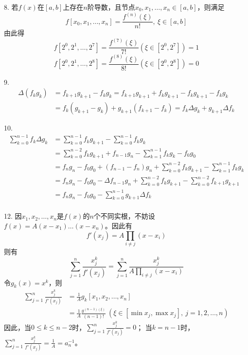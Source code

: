 \documentclass[12pt, a4paper]{article}
\theoremstyle{margin}
\begin{document}
8. 若$f\left(x\right)$在$\left[a,b\right]$上存在$n$阶导数，且节点$x_0,x_1,\dots,x_n\in \left[a,b\right]$，则满足
$$f\left[x_0,x_1,\dots,x_n\right]=\frac{f^{\left(n\right)}\left(\xi\right)}{n!},\ \xi\in \left[a,b\right]$$
由此得
$$f\left[2^0,2^1,\dots,2^7\right]=\frac{f^{\left(7\right)}\left(\xi\right)}{7!}\left(\xi \in \left[2^0,2^7\right]\right) = 1$$
$$f\left[2^0,2^1,\dots,2^8\right]=\frac{f^{\left(8\right)}\left(\xi\right)}{8!}\left(\xi \in \left[2^0,2^8\right]\right) = 0$$
\newline

9. 
\[\begin{split}
	\Delta\left(f_k g_k\right)&=f_{k+1} g_{k+1} - f_k g_k = f_{k+1} g_{k+1} + f_{k} g_{k+1} - f_{k} g_{k+1} - f_k g_k \\
	&= f_k\left(g_{k+1}-g_k\right) + g_{k+1} \left(f_{k+1}-f_{k}\right)=f_k \Delta g_k+g_{k+1}\Delta f_k
\end{split}\]
\newline 

10. 
\[\begin{split}
	\sum_{k=0}^{n-1}f_k\Delta g_k &= \sum_{k=0}^{n-1}f_k g_{k+1} - \sum_{k=0}^{n-1}f_k g_{k} \\
	&=\sum_{k=0}^{n-2}f_k g_{k+1} + f_{n-1} g_n - \sum_{k=1}^{n-1}f_k g_{k} - f_0 g_0 \\
	&=f_n g_n - f_0 g_0 + \left(f_{n-1} - f_n\right) g_n + \sum_{k=0}^{n-2}f_k g_{k+1} - \sum_{k=1}^{n-1}f_k g_{k} \\
	&= f_n g_n - f_0 g_0 - \Delta f_{n-1} g_n + \sum_{k=0}^{n-2}f_k g_{k+1} - \sum_{k=0}^{n-2}f_{k+1} g_{k+1} \\
  &= f_n g_n - f_0 g_0 - \sum_{k=0}^{n-1} g_{k+1} \Delta f_k \\
\end{split}\]
\newline 

12. 因$x_1,x_2,\dots,x_n$是$f\left(x\right)$的$n$个不同实根，不妨设$f\left(x\right)=A\left(x-x_1\right)\dots\left(x-x_n\right)$。因此有
\[f'\left(x_j\right)=A\prod_{i\ne j}\left(x-x_i\right)\]
则有
\[\sum_{j=1}^{n}\frac{x_j^k}{f'\left(x_j\right)}=\sum_{j=1}^{n}\frac{x_j^k}{A\prod_{i\ne j}\left(x-x_i\right)}\]
令$g_k\left(x\right)=x^k$，则
\[\begin{split}
\sum_{j=1}^{n}\frac{x_j^k}{f'\left(x_j\right)}&=\frac{1}{A} g_k\left[x_1,x_2,\dots,x_n\right]\\
&=\frac{1}{A} \frac{g^{\left(n-1\right)\left(\xi\right)}}{\left(n-1\right)!}\ \left(\xi \in \left[\min x_j, \max x_j\right],\ j=1,2,\dots,n\right)
\end{split}\]
因此，当$0\leq k\leq n-2$时，$\sum_{j=1}^{n}\frac{x_j^k}{f'\left(x_j\right)}=0$；
当$k=n-1$时，$\sum_{j=1}^{n}\frac{x_j^k}{f'\left(x_j\right)}=\frac{1}{A}=a_n^{-1}$。
\end{document}
